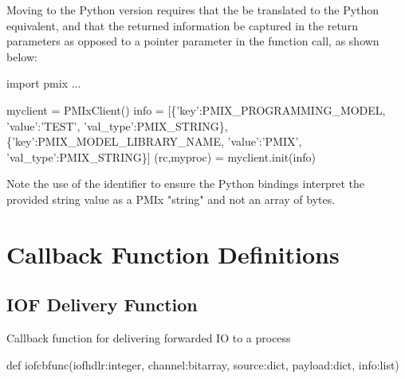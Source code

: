 Moving to the Python version requires that the  be translated to the Python  equivalent, and that the returned information be captured in the return parameters as opposed to a pointer parameter in the function call, as shown below:

\pyspecificstart
\begin{codepar}
import pmix
...

myclient = PMIxClient()
info = [\{'key':PMIX_PROGRAMMING_MODEL,
          'value':'TEST', 'val_type':PMIX_STRING\},
        \{'key':PMIX_MODEL_LIBRARY_NAME,
          'value':'PMIX', 'val_type':PMIX_STRING\}]
(rc,myproc) = myclient.init(info)
\end{codepar}
\pyspecificend

Note the use of the  identifier to ensure the Python bindings interpret the provided string value as a \ac{PMIx} "string" and not an array of bytes.


\section{Callback Function Definitions}
\label{app:python:fns}

\subsection{IOF Delivery Function}

\summary

Callback function for delivering forwarded \ac{IO} to a process

\format

\pyspecificstart
\begin{codepar}
def iofcbfunc(iofhdlr:integer, channel:bitarray,
              source:dict, payload:dict, info:list)
\end{codepar}
\pyspecificend

\begin{arglist}
\end{arglist}

